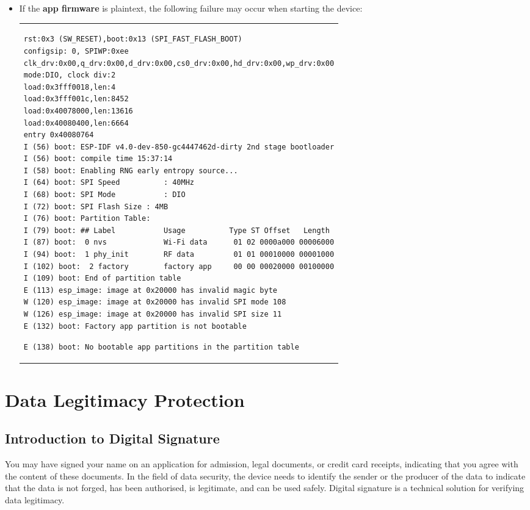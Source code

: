 \documentclass[a4paper,12pt]{book}
\begin{document}
\begin{itemize}[leftmargin=1em]
    \item If the \textbf{app firmware} is plaintext, the following failure may occur when starting the device:

\begin{codebloc}
\begin{tabular}{a}
\begin{verbatim}
rst:0x3 (SW_RESET),boot:0x13 (SPI_FAST_FLASH_BOOT)
configsip: 0, SPIWP:0xee
clk_drv:0x00,q_drv:0x00,d_drv:0x00,cs0_drv:0x00,hd_drv:0x00,wp_drv:0x00
mode:DIO, clock div:2
load:0x3fff0018,len:4
load:0x3fff001c,len:8452
load:0x40078000,len:13616
load:0x40080400,len:6664
entry 0x40080764
I (56) boot: ESP-IDF v4.0-dev-850-gc4447462d-dirty 2nd stage bootloader
I (56) boot: compile time 15:37:14
I (58) boot: Enabling RNG early entropy source...
I (64) boot: SPI Speed      	: 40MHz
I (68) boot: SPI Mode       	: DIO
I (72) boot: SPI Flash Size	: 4MB
I (76) boot: Partition Table:
I (79) boot: ## Label           Usage          Type ST Offset   Length
I (87) boot:  0 nvs             Wi-Fi data      01 02 0000a000 00006000
I (94) boot:  1 phy_init        RF data         01 01 00010000 00001000
I (102) boot:  2 factory        factory app     00 00 00020000 00100000
I (109) boot: End of partition table
E (113) esp_image: image at 0x20000 has invalid magic byte
W (120) esp_image: image at 0x20000 has invalid SPI mode 108
W (126) esp_image: image at 0x20000 has invalid SPI size 11
E (132) boot: Factory app partition is not bootable
\end{verbatim}
\vspace{-6pt}
\verb|E (138) boot: No bootable app partitions in the partition table|
\end{tabular}
\end{codebloc}

\end{itemize}

\section{Data Legitimacy Protection}
\subsection{Introduction to Digital Signature}
You may have signed your name on an application for admission, legal documents, or credit card receipts, indicating that you agree with the content of these documents. In the field of data security, the device needs to identify the sender or the producer of the data to indicate that the data is not forged, has been authorised, is legitimate, and can be used safely. Digital signature is a technical solution for verifying data legitimacy.
\end{document}

